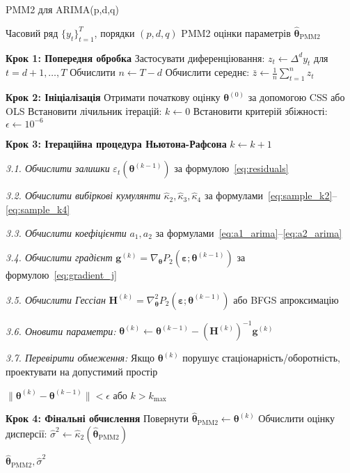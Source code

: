 \documentclass[12pt,a4paper]{article}
\begin{document}
	\begin{algorithm}[H]
		\caption{PMM2 для ARIMA(p,d,q)}
		\label{alg:pmm2_arima}
		\begin{algorithmic}[1]
			\REQUIRE Часовий ряд $\{y_t\}_{t=1}^T$, порядки $(p, d, q)$
			\ENSURE PMM2 оцінки параметрів $\hat{\boldsymbol{\theta}}_{\text{PMM2}}$
			
			\STATE \textbf{Крок 1: Попередня обробка}
			\STATE Застосувати диференціювання: $z_t \leftarrow \Delta^d y_t$ для $t = d+1, \ldots, T$
			\STATE Обчислити $n \leftarrow T - d$
			\STATE Обчислити середнє: $\bar{z} \leftarrow \frac{1}{n}\sum_{t=1}^{n} z_t$
			
			\STATE \textbf{Крок 2: Ініціалізація}
			\STATE Отримати початкову оцінку $\boldsymbol{\theta}^{(0)}$ за допомогою CSS або OLS
			\STATE Встановити лічильник ітерацій: $k \leftarrow 0$
			\STATE Встановити критерій збіжності: $\epsilon \leftarrow 10^{-6}$
			
			\STATE \textbf{Крок 3: Ітераційна процедура Ньютона-Рафсона}
			\REPEAT
			\STATE $k \leftarrow k + 1$
			
			\STATE \textit{3.1. Обчислити залишки} $\varepsilon_t(\boldsymbol{\theta}^{(k-1)})$ за формулою~\eqref{eq:residuals}
			
			\STATE \textit{3.2. Обчислити вибіркові кумулянти} $\hat{\kappa}_2, \hat{\kappa}_3, \hat{\kappa}_4$ за формулами~\eqref{eq:sample_k2}--\eqref{eq:sample_k4}
			
			\STATE \textit{3.3. Обчислити коефіцієнти} $a_1, a_2$ за формулами~\eqref{eq:a1_arima}--\eqref{eq:a2_arima}
			
			\STATE \textit{3.4. Обчислити градієнт} $\mathbf{g}^{(k)} = \nabla_{\boldsymbol{\theta}} P_2(\boldsymbol{\varepsilon}; \boldsymbol{\theta}^{(k-1)})$ за формулою~\eqref{eq:gradient_j}
			
			\STATE \textit{3.5. Обчислити Гессіан} $\mathbf{H}^{(k)} = \nabla^2_{\boldsymbol{\theta}} P_2(\boldsymbol{\varepsilon}; \boldsymbol{\theta}^{(k-1)})$ або BFGS апроксимацію
			
			\STATE \textit{3.6. Оновити параметри:} $\boldsymbol{\theta}^{(k)} \leftarrow \boldsymbol{\theta}^{(k-1)} - (\mathbf{H}^{(k)})^{-1} \mathbf{g}^{(k)}$
			
			\STATE \textit{3.7. Перевірити обмеження:} Якщо $\boldsymbol{\theta}^{(k)}$ порушує стаціонарність/оборотність, проектувати на допустимий простір
			
			\UNTIL $\|\boldsymbol{\theta}^{(k)} - \boldsymbol{\theta}^{(k-1)}\| < \epsilon$ або $k > k_{\max}$
			
			\STATE \textbf{Крок 4: Фінальні обчислення}
			\STATE Повернути $\hat{\boldsymbol{\theta}}_{\text{PMM2}} \leftarrow \boldsymbol{\theta}^{(k)}$
			\STATE Обчислити оцінку дисперсії: $\hat{\sigma}^2 \leftarrow \hat{\kappa}_2(\hat{\boldsymbol{\theta}}_{\text{PMM2}})$
			
			\RETURN $\hat{\boldsymbol{\theta}}_{\text{PMM2}}, \hat{\sigma}^2$
		\end{algorithmic}
	\end{algorithm}
	
\end{document}
